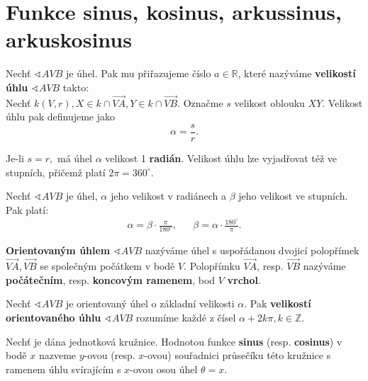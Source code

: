 \section{Funkce sinus, kosinus, arkussinus, arkuskosinus}
\begin{definition}
    Nechť $\sphericalangle AVB$ je úhel. Pak mu přiřazujeme číslo $a\in \mathbb R$,
    které nazýváme \textbf{velikostí úhlu} $\sphericalangle AVB$ takto:\\
    Nechť $k(V,r), X\in k\cap \overrightarrow{VA}, Y\in k\cap \overrightarrow{VB}.$
    Označme $s$ velikost oblouku $XY.$ Velikost úhlu pak definujeme jako
    $$\alpha = \frac{s}{r}.$$
\end{definition}

\begin{pozn}
    Je-li $s=r,$ má úhel $\alpha$ velikost 1 \textbf{radián}. Velikost úhlu lze vyjadřovat
    též ve stupních, přičemž platí $2\pi=360^\circ$.
\end{pozn}

\begin{veta}
    Nechť $\sphericalangle AVB$ je úhel, $\alpha$ jeho velikost v radiánech a $\beta$
    jeho velikost ve stupních. Pak platí:
    \begin{align*}
        \alpha = \beta\cdot \frac{\pi}{180^\circ}, & & \beta = \alpha\cdot \frac{180^\circ}{\pi}.
    \end{align*}
\end{veta}

\begin{definition}
    \textbf{Orientovaným úhlem} $\sphericalangle AVB$ nazýváme úhel s uspořádanou dvojicí
    polopřímek $\overrightarrow{VA}, \overrightarrow{VB}$ se společným počátkem v bodě $V.$
    Polopřímku $\overrightarrow{VA}$, resp. $\overrightarrow{VB}$ nazýváme \textbf{počátečním},
    resp. \textbf{koncovým ramenem}, bod $V$ \textbf{vrchol}.
\end{definition}

\begin{definition}
    Nechť $\sphericalangle AVB$ je orientovaný úhel o základní velikosti $\alpha.$ Pak
    \textbf{velikostí orientovaného úhlu} $\sphericalangle AVB$ rozumíme každé z
    čísel $\alpha +2k\pi, k \in \mathbb Z.$
\end{definition}

\begin{definition}
  Nechť je dána jednotková kružnice. Hodnotou funkce \textbf{sinus} (resp. \textbf{cosinus})
  v bodě $x$ nazveme $y$-ovou (resp. $x$-ovou) souřadnici průsečíku této kružnice s ramenem
  úhlu svírajícím s $x$-ovou osou úhel $\theta = x$.
\end{definition}

